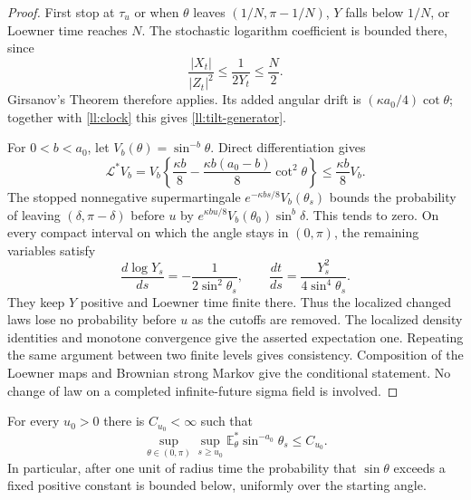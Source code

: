 \begin{proof}
First stop at $\tau_u$ or when $\theta$ leaves $(1/N,\pi-1/N)$,
$Y$ falls below $1/N$, or Loewner time reaches $N$.  The stochastic
logarithm coefficient is bounded there, since
\[
 \frac{|X_t|}{|Z_t|^2}\le\frac1{2Y_t}\le\frac N2.
\]
Girsanov's Theorem therefore applies. Its added
angular drift is $(\kappa a_0/4)\cot\theta$; together with
\eqref{ll:clock} this gives \eqref{ll:tilt-generator}.

For $0<b<a_0$, let $V_b(\theta)=\sin^{-b}\theta$. Direct
differentiation gives
\begin{equation}
 \mathcal L^*V_b
 =V_b\left\{\frac{\kappa b}{8}
          -\frac{\kappa b(a_0-b)}8\cot^2\theta\right\}
 \le\frac{\kappa b}{8}V_b.
 \label{ll:lyapunov}
\end{equation}
The stopped nonnegative supermartingale
$e^{-\kappa bs/8}V_b(\theta_s)$ bounds the probability of leaving
$(\delta,\pi-\delta)$ before $u$ by
$e^{\kappa bu/8}V_b(\theta_0)\sin^b\delta$.
This tends to zero. On every compact interval on which the angle
stays in $(0,\pi)$, the remaining variables satisfy
\begin{equation}
 \frac{d\log Y_s}{ds}=-\frac1{2\sin^2\theta_s},
 \qquad
 \frac{dt}{ds}=\frac{Y_s^2}{4\sin^4\theta_s}.
 \label{ll:physical-clock}
\end{equation}
They keep $Y$ positive and Loewner time finite there. Thus the
localized changed laws lose no probability before $u$ as the
cutoffs are removed. The localized density identities and monotone
convergence give the asserted expectation one. Repeating the same
argument between two finite levels gives consistency. Composition
of the Loewner maps and Brownian strong Markov give the conditional
statement. No change of law on a completed infinite-future sigma
field is involved.
\end{proof}

\begin{lemma}\label{ll:inverse-angle}
For every $u_0>0$ there is $C_{u_0}<\infty$ such that
\[
 \sup_{\theta\in(0,\pi)}\sup_{s\ge u_0}
 \mathbb E^*_{\theta}\sin^{-a_0}\theta_s\le C_{u_0}.
\]
In particular, after one unit of radius time the probability that
$\sin\theta$ exceeds a fixed positive constant is bounded below,
uniformly over the starting angle.
\end{lemma}

